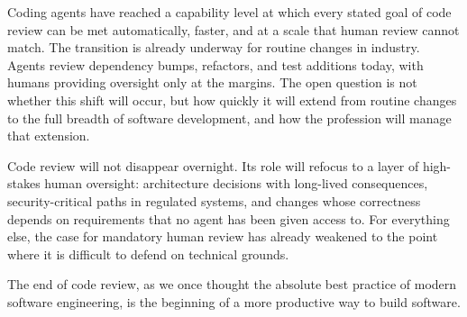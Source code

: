 \documentclass[10pt,conference]{IEEEtran}
\begin{document}
Coding agents have reached a capability level at which every stated goal of code review can be met automatically, faster, and at a scale that human review cannot match.
The transition is already underway for routine changes in industry.
Agents review dependency bumps, refactors, and test additions today, with humans providing oversight only at the margins.
The open question is not whether this shift will occur, but how quickly it will extend from routine changes to the full breadth of software development, and how the profession will manage that extension.

Code review will not disappear overnight.
Its role will refocus to a layer of high-stakes human oversight: architecture decisions with long-lived consequences, security-critical paths in regulated systems, and changes whose correctness depends on requirements that no agent has been given access to.
For everything else, the case for mandatory human review has already weakened to the point where it is difficult to defend on technical grounds.

The end of code review, as we once thought the absolute best practice of modern software engineering, is the beginning of a more productive way to build software.

\balance


\end{document}
